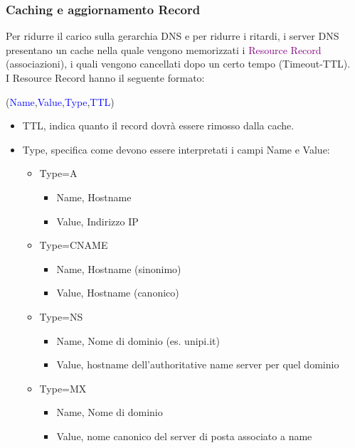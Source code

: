 \subsubsection{Caching e aggiornamento Record}
Per ridurre il carico sulla gerarchia DNS e per ridurre i ritardi, i server DNS presentano un cache nella quale vengono memorizzati i \textcolor{purple}{Resource Record} (associazioni), i quali vengono cancellati dopo un certo tempo (Timeout-TTL).
\\I Resource Record hanno il seguente formato:
\begin{center}
    (\textcolor{blue}{Name},\textcolor{blue}{Value},\textcolor{blue}{Type},\textcolor{blue}{TTL})
\end{center}
\begin{itemize}
    \item TTL, indica quanto il record dovrà essere rimosso dalla cache.
    \item Type, specifica come devono essere interpretati i campi Name e Value:
        \begin{itemize}
            \item Type=A
                \begin{itemize}
                    \item Name, Hostname
                    \item Value, Indirizzo IP
                \end{itemize}
            \item Type=CNAME
                \begin{itemize}
                    \item Name, Hostname (sinonimo)
                    \item Value, Hostname (canonico)
                \end{itemize}
            \item Type=NS
                \begin{itemize}
                    \item Name, Nome di dominio (es. unipi.it)
                    \item Value, hostname dell'authoritative name server per quel dominio
                \end{itemize}  
            \item Type=MX 
                \begin{itemize}
                    \item Name, Nome di dominio
                    \item Value, nome canonico del server di posta associato a name
                \end{itemize}  
        \end{itemize}
\end{itemize}

